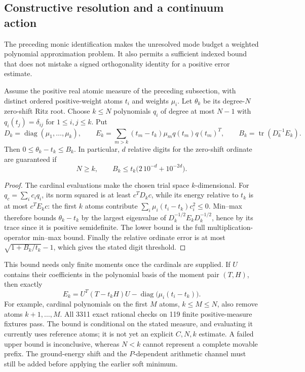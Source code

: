\subsection{Constructive resolution and a continuum action}
\label{sec:indexed-leakage-action}

The preceding monic identification makes the unresolved mode budget a
weighted polynomial approximation problem. It also permits a sufficient
indexed bound that does not mistake a signed orthogonality identity for
a positive error estimate.

\begin{proposition}
\label{prop:cardinal-resolution}
Assume the positive real atomic measure of the preceding subsection,
with distinct ordered positive-weight atoms $t_i$ and weights $\mu_i$.
Let $\theta_k$ be its degree-$N$ zero-shift Ritz root. Choose $k\leq N$
polynomials $q_i$ of degree at most $N-1$ with
$q_i(t_j)=\delta_{ij}$ for $1\leq i,j\leq k$. Put
\[
 D_k=\operatorname{diag}(\mu_1,\ldots,\mu_k),\qquad
 E_k=\sum_{m>k}(t_m-t_k)\mu_m q(t_m)q(t_m)^T,
 \qquad B_k=\operatorname{tr}(D_k^{-1}E_k).
\]
Then $0\leq\theta_k-t_k\leq B_k$. In particular, $d$ relative digits
for the zero-shift ordinate are guaranteed if
\[
 N\geq k,\qquad B_k\leq t_k\bigl(2\,10^{-d}+10^{-2d}\bigr).
\]
\end{proposition}
\begin{proof}
The cardinal evaluations make the chosen trial space $k$-dimensional.
For $q_c=\sum_i c_iq_i$, its norm squared is at least $c^TD_kc$, while
its energy relative to $t_k$ is at most $c^TE_kc$: the first $k$ atoms
contribute $\sum_i\mu_i(t_i-t_k)c_i^2\leq0$. Min--max therefore bounds
$\theta_k-t_k$ by the largest eigenvalue of
$D_k^{-1/2}E_kD_k^{-1/2}$, hence by its trace since it is positive
semidefinite. The lower bound is the full multiplication-operator
min--max bound. Finally the relative ordinate error is at most
$\sqrt{1+B_k/t_k}-1$, which gives the stated digit threshold.
\end{proof}

This bound needs only finite moments once the cardinals are supplied.
If $U$ contains their coefficients in the polynomial basis of the
moment pair $(T,H)$, then exactly
\[
 E_k=U^T(T-t_kH)U-\operatorname{diag}\bigl(\mu_i(t_i-t_k)\bigr).
\]
For example, cardinal polynomials on the first $M$ atoms, $k\leq M\leq N$,
also remove atoms $k+1,\ldots,M$. All 3311 exact rational checks on
119 finite positive-measure fixtures pass. The bound is conditional on
the stated measure, and evaluating it currently uses reference atoms;
it is not yet an explicit $C,N,k$ estimate. A failed upper bound is
inconclusive, whereas $N<k$ cannot represent a complete movable prefix.
The ground-energy shift and the $P$-dependent arithmetic channel must
still be added before applying the earlier soft minimum.

